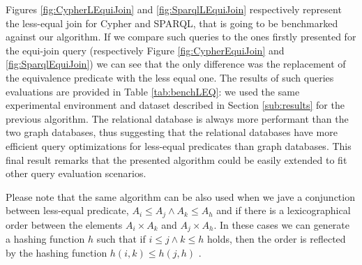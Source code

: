 Figures \ref{fig:CypherLEquiJoin} and \ref{fig:SparqlLEquiJoin} respectively represent the less-equal join for Cypher and SPARQL, that is going to be benchmarked against our algorithm. If we compare such queries to the ones firstly presented for the equi-join query (respectively Figure \vref{fig:CypherEquiJoin} and \ref{fig:SparqlEquiJoin}) we can see that the only difference was the replacement of the equivalence predicate with the less equal one.  The results of such queries evaluations are provided in Table \ref{tab:benchLEQ}: we used the same experimental environment and dataset described in Section \vref{sub:results} for the previous algorithm. The relational database is always more performant than the two graph databases, thus suggesting that the relational databases have more efficient query optimizations for less-equal  predicates than graph databases. This final result remarks that the presented algorithm could be easily extended to fit other query evaluation scenarios.

Please note that the same algorithm can be also used when we jave a conjunction between less-equal predicate, $A_i\leq A_j\wedge A_k\leq A_h$ and if there is a lexicographical order between the elements ${A_i\times A_k}$ and $A_j\times A_h$. In these cases we can generate a hashing function $h$ such that if $i\leq j \wedge k\leq h$ holds, then the order is reflected by the hashing function $h(i,k)\leq h(j,h)$ \cite{BelazzouguiBPV11}.
